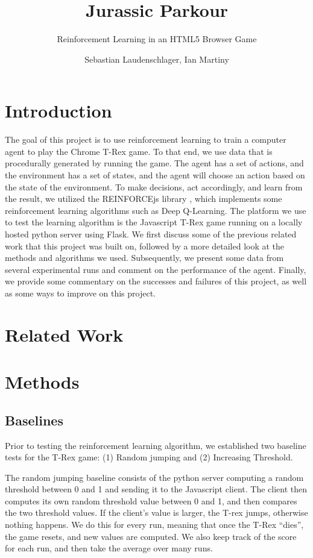 \documentclass{scrartcl}
\title{Jurassic Parkour}
\subtitle{Reinforcement Learning in an HTML5 Browser Game}
\author{Sebastian Laudenschlager, Ian Martiny}
\begin{document}
\maketitle

\section{Introduction}

The goal of this project is to use reinforcement learning to train a computer agent to play the Chrome T-Rex game. To that end, we use data that is procedurally generated by running the game. The agent has a set of actions, and the environment has a set of states, and the agent will choose an action based on the state of the environment. To make decisions, act accordingly, and learn from the result, we utilized the REINFORCEjs library \cite{reinforcejs}, which implements some reinforcement learning algorithms such as Deep Q-Learning. The platform we use to test the learning algorithm is the Javascript T-Rex game running on a locally hosted python server using Flask. We first discuss some of the previous related work that this project was built on, followed by a more detailed look at the methods and algorithms we used. Subsequently, we present some data from several experimental runs and comment on the performance of the agent. Finally, we provide some commentary on the successes and failures of this project, as well as some ways to improve on this project.

\section{Related Work}

\section{Methods}

    \subsection{Baselines}
    Prior to testing the reinforcement learning algorithm, we established two baseline tests for the T-Rex game: (1) Random jumping and (2) Increasing Threshold.

    \par The random jumping baseline consists of the python server computing a random threshold between 0 and 1 and sending it to the Javascript client. The client then computes its own random threshold value between 0 and 1, and then compares the two threshold values. If the client's value is larger, the T-rex jumps, otherwise nothing happens. We do this for every run, meaning that once the T-Rex ``dies'', the game resets, and new values are computed. We also keep track of the score for each run, and then take the average over many runs.
\end{document}
